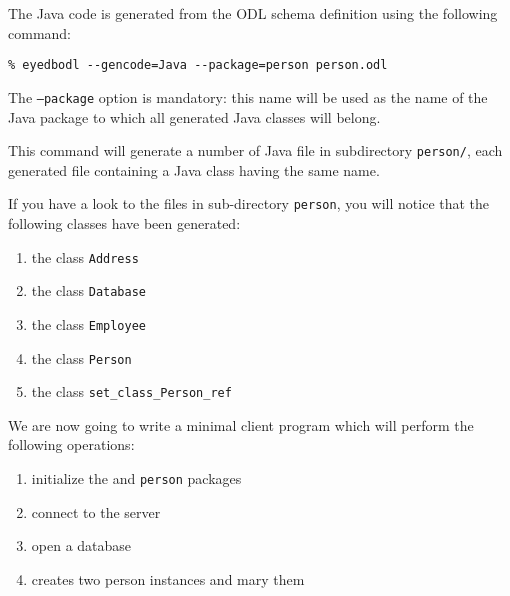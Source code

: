 
The Java code is generated from the ODL schema definition using the following command:
\verbsize \begin{verbatim}
% eyedbodl --gencode=Java --package=person person.odl
\end{verbatim}
\normalsize
The \texttt{--package} option is mandatory: this name will be used as the name of the Java package to which all generated Java classes will belong.

This command will generate a number of Java file in subdirectory \texttt{person/},
each generated file containing a Java class having the same name.

If you have a look to the files in sub-directory \texttt{person},
you will notice that the following classes have been generated:
\begin{enumerate}
\item the class \texttt{Address}
\item the class \texttt{Database}
\item the class \texttt{Employee}
\item the class \texttt{Person}
\item the class \texttt{set\_class\_Person\_ref}
\end{enumerate}




We are now going to write a minimal client program which will perform
the following operations:
\begin{enumerate}
\item initialize the \eyedb and \texttt{person} packages
\item connect to the \eyedb server
\item open a database
\item creates two person instances and mary them
\end{enumerate}

